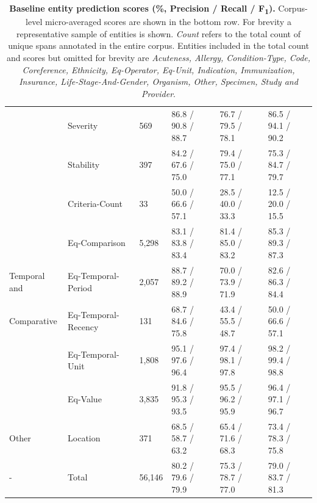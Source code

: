 \documentclass[fleqn,10pt]{wlscirep}
\begin{document}
\begin{table}[tp]
\begin{tabular}{m{2cm} m{3.2cm} m{1.4cm} m{2.7cm} m{2.7cm} m{2.7cm}}
         & Severity & 569 & 86.8 / 90.8 / 88.7 & 76.7 / 79.5 / 78.1 & 86.5 / 94.1 / 90.2 \\
         & Stability & 397 & 84.2 / 67.6 / 75.0 & 79.4 / 75.0 / 77.1 & 75.3 / 84.7 / 79.7 \\
    \hline
      &
        Criteria-Count & 33 & 50.0 / 66.6 / 57.1 & 28.5 / 40.0 / 33.3 & 12.5 / 20.0 / 15.5 \\
     & Eq-Comparison & 5,298 & 83.1 / 83.8 / 83.4 & 81.4 / 85.0 / 83.2 & 85.3 / 89.3 / 87.3 \\
     Temporal and & Eq-Temporal-Period & 2,057 & 88.7 / 89.2 / 88.9 & 70.0 / 73.9 / 71.9 & 82.6 / 86.3 / 84.4 \\
     Comparative & Eq-Temporal-Recency & 131 & 68.7 / 84.6 / 75.8 & 43.4 / 55.5 / 48.7 & 50.0 / 66.6 / 57.1 \\
     & Eq-Temporal-Unit & 1,808 & 95.1 / 97.6 / 96.4 & 97.4 / 98.1 / 97.8 & 98.2 / 99.4 / 98.8 \\
     & Eq-Value & 3,835 & 91.8 / 95.3 / 93.5 & 95.5 / 96.2 / 95.9 & 96.4 / 97.1 / 96.7  \\
    \hline   
    Other &
        Location & 371 & 68.5 / 58.7 / 63.2 & 65.4 / 71.6 / 68.3 & 73.4 / 78.3 / 75.8 \\
    \hline
    - & Total & 56,146 & 80.2 / 79.6 / 79.9 & 75.3 / 78.7 / 77.0 & 79.0 / 83.7 / 81.3 \\
    
\end{tabular}

    \caption{\textbf{Baseline entity prediction scores (\%, Precision / Recall / F\textsubscript{1}).} Corpus-level micro-averaged scores are shown in the bottom row. For brevity a representative sample of entities is shown. \textit{Count} refers to the total count of unique spans annotated in the entire corpus. Entities included in the total count and scores but omitted for brevity are \textit{Acuteness, Allergy, Condition-Type, Code, Coreference, Ethnicity, Eq-Operator, Eq-Unit, Indication, Immunization, Insurance, Life-Stage-And-Gender, Organism, Other, Specimen, Study and Provider}.}
    \label{entity_f1}
\end{table}
\end{document}
